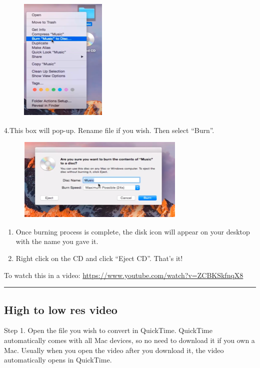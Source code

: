 \documentclass[]{book}
\begin{document}
\begin{figure}
\centering
\includegraphics{images/lab_protocols/cd_burning/2.png}
\caption{}
\end{figure}

4.This box will pop-up. Rename file if you wish. Then select ``Burn''.

\begin{figure}
\centering
\includegraphics{images/lab_protocols/cd_burning/3.png}
\caption{}
\end{figure}

\begin{enumerate}
\def\labelenumi{\arabic{enumi}.}
\setcounter{enumi}{4}
\item
  Once burning process is complete, the disk icon will appear on your
  desktop with the name you gave it.
\item
  Right click on the CD and click ``Eject CD''. That's it!
\end{enumerate}

To watch this in a video:
\url{https://www.youtube.com/watch?v=ZCBKSkfnqX8}

\begin{center}\rule{0.5\linewidth}{0.5pt}\end{center}

\subsection{High to low res video}\label{high-to-low-res-video}

Step 1. Open the file you wish to convert in QuickTime. QuickTime
automatically comes with all Mac devices, so no need to download it if
you own a Mac. Usually when you open the video after you download it,
the video automatically opens in QuickTime.
\end{document}
